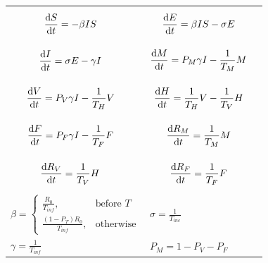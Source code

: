 \documentclass[11pt]{article}
\begin{document}
\begin{table}[H]
  \centering
  \renewcommand{\arraystretch}{2}
  \begin{tabular}{ll}
    \begin{equation} \label{eq1}
        \dv{S}{t} = - \beta I S \quad 
    \end{equation} & 

    \begin{equation} \label{eq2}
        \dv{E}{t} = \beta I S - \sigma E \quad
    \end{equation}\\

    \begin{equation} \label{eq3}
        \dv{I}{t} = \sigma E - \gamma I \quad
    \end{equation} &

    \begin{equation} \label{eq4}
    \dv{M}{t} = P_M \gamma I - \frac{1}{T_M} M\quad
    \end{equation}\\

    \begin{equation} \label{eq5}
    \dv{V}{t} = P_V \gamma I - \frac{1}{T_H} V\quad
    \end{equation}&

    \begin{equation} \label{eq6}
    \dv{H}{t} = \frac{1}{T_H} V - \frac{1}{T_V} H\quad
    \end{equation}\\

    \begin{equation} \label{eq7}
    \dv{F}{t} = P_F \gamma I - \frac{1}{T_F} F\quad
    \end{equation}&    

    \begin{equation} \label{eq8}
    \dv{R_M}{t} = \frac{1}{T_M} M\quad
    \end{equation}\\

    \begin{equation} \label{eq9}
    \dv{R_V}{t} = \frac{1}{T_V} H\quad
    \end{equation}&

    \begin{equation} \label{eq10}
    \dv{R_F}{t} = \frac{1}{T_F} F\quad
    \end{equation}\\
    
    $\beta = 
    \begin{cases}
        \frac{R_0}{T_{inf}}, & \text{before } T\\
        \frac{(1-P_T) R_0}{T_{inf}}, & \text{otherwise}
    \end{cases}$ & $\sigma = \frac{1}{T_{inc}}$ \\
    $\gamma = \frac{1}{T_{inf}}$ & $P_M = 1 - P_V - P_F$ \\
  \end{tabular}
\end{table}
\end{document}

